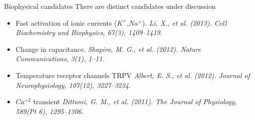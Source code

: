 \documentclass[aspectratio=43]{beamer}
\begin{document}
\begin{frame}{Biophysical candidates}
		There are distinct candidates under discussion
		\begin{itemize}
				\item{Fast activation of ionic currents	($K^+$,$Na^+$). \small{\textit{Li, X., et al. (2013). Cell Biochemistry and Biophysics, 67(3), 1409–1419.}}}
				\item{Change in capacitance. \small{\textit{Shapiro, M. G., et al. (2012). Nature Communications, 3(1), 1–11.}}}
				\item{Temperature receptor channels TRPV \small{\textit{Albert, E. S., et al. (2012). Journal of Neurophysiology, 107(12), 3227–3234}}.
					}
				\item{$Ca^{+2}$ transient \small{\textit{Dittami, G. M., et al. (2011). The Journal of Physiology, 589(Pt 6), 1295–1306.}}}
				
		\end{itemize}
\end{frame}
\end{document}
